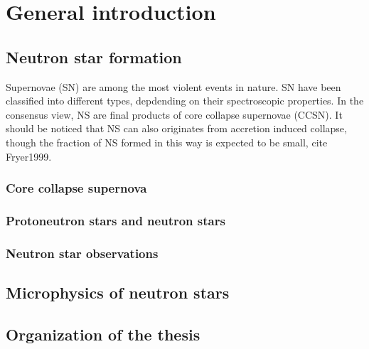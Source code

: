 \chapter*{General introduction}\adjustmtc
{}

% 
%

\section*{Neutron star formation}\adjustmtc
{}

Supernovae (SN) are among the most violent events in nature. 
%
SN have been classified into different types, depdending on their 
spectroscopic properties. 
%
In the consensus view, NS are final products of core collapse supernovae 
(CCSN).
It should be noticed that NS can also originates from accretion induced 
collapse, though the fraction of NS formed in this way is expected to be 
small, cite Fryer1999.

\subsection*{Core collapse supernova}





\subsection*{Protoneutron stars and neutron stars}



\subsection*{Neutron star observations}

\section*{Microphysics of neutron stars}\adjustmtc
{}

\section*{Organization of the thesis}\adjustmtc
{}

\clearpage\thispagestyle{empty}
